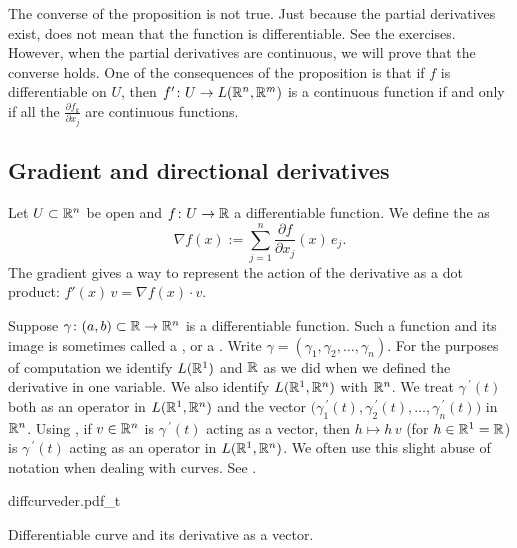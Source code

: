 The converse of the proposition is not true.  Just because the partial
derivatives exist, does not mean that the function is differentiable.  See
the exercises.
However, when the partial derivatives are continuous, we will prove that the
converse holds.
One of the consequences of the proposition is that if $f$
is differentiable on $U$, then $f' \colon U \to
L({\mathbb{R}}^n,{\mathbb{R}}^m)$ is a continuous function if and only if
all the $\frac{\partial f_k}{\partial x_j}$ are continuous functions.

\subsection{Gradient and directional derivatives}

Let $U \subset {\mathbb{R}}^n$ be open and $f \colon U \to {\mathbb{R}}$ a differentiable
function.  We define
the \emph{} as
\begin{equation*}
\nabla f (x) := \sum_{j=1}^n \frac{\partial f}{\partial x_j} (x)\, e_j .
\end{equation*}
The gradient gives a way to represent the action of
the derivative as a dot product: $f'(x)\,v = \nabla f(x) \cdot v$.

Suppose $\gamma \colon (a,b) \subset {\mathbb{R}} \to {\mathbb{R}}^n$ is a differentiable
function.
Such a function and its image is sometimes called a \emph{},
or a \emph{}.
Write $\gamma =
(\gamma_1,\gamma_2,\ldots,\gamma_n)$.
For the purposes of computation
we identify $L({\mathbb{R}}^1)$ and ${\mathbb{R}}$ as we did when we defined the
derivative in one variable.
We also identify $L({\mathbb{R}}^1,{\mathbb{R}}^n)$ with ${\mathbb{R}}^n$.
We treat $\gamma^{\:\prime}(t)$ both as an operator in
$L({\mathbb{R}}^1,{\mathbb{R}}^n)$ and the vector
$\bigl(\gamma_1^{\:\prime}(t),
\gamma_2^{\:\prime}(t),\ldots,\gamma_n^{\:\prime}(t)\bigr)$
in ${\mathbb{R}}^n$.
Using ,
if $v\in {\mathbb{R}}^n$ is $\gamma^{\:\prime}(t)$ acting as a vector,
then $h \mapsto h \, v$ (for $h \in {\mathbb{R}}^1 = {\mathbb{R}}$) is
$\gamma^{\:\prime}(t)$ acting as an operator
in $L({\mathbb{R}}^1,{\mathbb{R}}^n)$.
We often use this 
slight abuse of notation when dealing with curves.
See .
\begin{myfigureht}
{diffcurveder.pdf_t}
\caption{Differentiable curve and its derivative as a
vector.\label{fig:difcurveder}}
\end{myfigureht}

